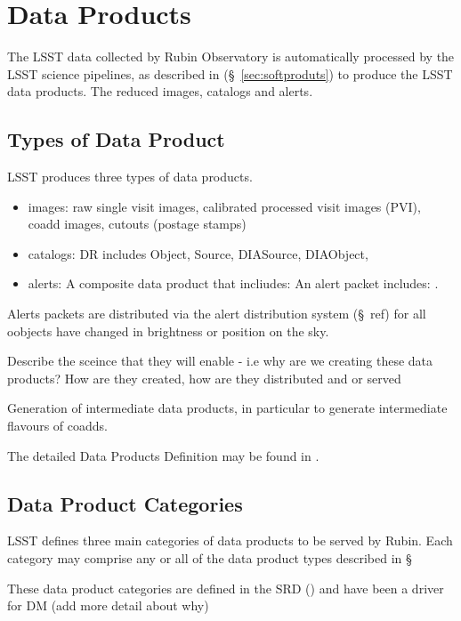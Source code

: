 \section{Data Products} \label{sec:dataproducts}

The LSST data collected by Rubin Observatory is automatically processed by the LSST science pipelines, as described in (\S~\ref{sec:softproduts})  to produce the LSST data products. The  reduced images, catalogs and alerts. 

\subsection{Types of Data Product} \label{sec:dp-categories}
LSST produces three types of data products. 
\begin{itemize}
\item images:  raw single visit images, calibrated processed visit images (PVI), coadd images, cutouts (postage stamps) 
\item catalogs: DR includes Object, Source, DIASource, DIAObject, 
\item alerts: A composite data product that incliudes:  An alert packet includes:  . \end{itemize}


Alerts packets are distributed via the alert distribution system (\S~ref) for  all oobjects  have changed in brightness or position on the sky.

Describe the sceince that they will enable - i.e why are we creating these data products? How are they created, how are they distributed and or served


Generation of intermediate data products, in particular to generate intermediate flavours of coadds. 

 The detailed  Data Products Definition may be found in  \cite{LSE-163}.


\subsection{Data Product Categories} \label{sec:dp-categories}
LSST defines three main categories of data products to be served by Rubin. 
Each category may comprise any or all of the data product types described in \S~

These data product categories are defined in the SRD (\citep{LPM-17}) and have been a driver for DM 
(add more detail about why) 


